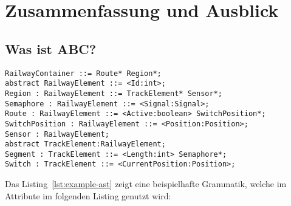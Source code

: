 \chapter{Zusammenfassung und Ausblick}\label{ch:conclusion}





\section{Was ist ABC?}

\blindtext

\blindtext


\begin{lstlisting}[language=AST,label={lst:example-ast},caption={Example AST}]
RailwayContainer ::= Route* Region*;
abstract RailwayElement ::= <Id:int>;
Region : RailwayElement ::= TrackElement* Sensor*;
Semaphore : RailwayElement ::= <Signal:Signal>;
Route : RailwayElement ::= <Active:boolean> SwitchPosition*;
SwitchPosition : RailwayElement ::= <Position:Position>;
Sensor : RailwayElement;
abstract TrackElement:RailwayElement;
Segment : TrackElement ::= <Length:int> Semaphore*;
Switch : TrackElement ::= <CurrentPosition:Position>;
\end{lstlisting}
%
Das Listing~\ref{lst:example-ast} zeigt eine beispielhafte Grammatik, welche im Attribute im folgenden Listing genutzt wird:


